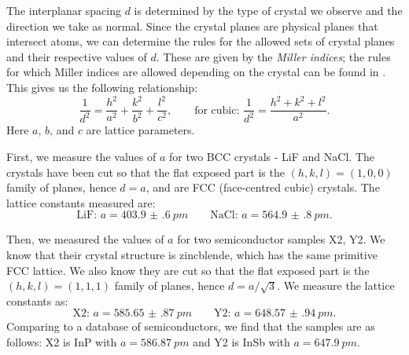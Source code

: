 \documentclass[11pt,a4paper,twoside,onecolumn]{article}
\begin{document}
The interplanar spacing $d$ is determined by the type of crystal we observe and the direction we take as normal. Since the crystal planes are physical planes that intersect atoms, we can determine the rules for the allowed sets of crystal planes and their respective values of $d$. These are given by the \emph{Miller indices}; the rules for which Miller indices are allowed depending on the crystal can be found in \cite{OxfPhys2010}. This gives us the following relationship:
\begin{equation}
    \frac{1}{d^2} = \frac{h^2}{a^2} + \frac{k^2}{b^2} + \frac{l^2}{c^2}, \qquad \text{for cubic: } \frac{1}{d^2} = \frac{h^2 + k^2 + l^2}{a^2}.
\end{equation}
Here $a$, $b$, and $c$ are lattice parameters.

First, we measure the values of $a$ for two BCC crystals - LiF and NaCl. The crystals have been cut so that the flat exposed part is the $\left(h,k,l\right) = \left(1,0,0\right)$ family of planes, hence $d = a$, and are FCC (face-centred cubic) crystals. The lattice constants measured are:
\begin{equation}
    \text{LiF: } a = \qty{403.9(6)}{pm} \qquad \text{NaCl: } a = \qty{564.9(8)}{pm}.
\end{equation}

Then, we measured the values of $a$ for two semiconductor samples X2, Y2. We know that their crystal structure is zincblende, which has the same primitive FCC lattice. We also know they are cut so that the flat exposed part is the $\left(h,k,l\right) = \left(1,1,1\right)$ family of planes, hence $d = a / \sqrt{3}$. We measure the lattice constants as:
\begin{equation}
    \text{X2: } a = \qty{585.65(87)}{pm} \qquad \text{Y2: } a = \qty{648.57(94)}{pm}.
\end{equation}
Comparing to a database of semiconductors, we find that the samples are as follows: X2 is InP with $a = \qty{586.87}{pm}$ and Y2 is InSb with $a = \qty{647.9}{pm}$.
\end{document}
